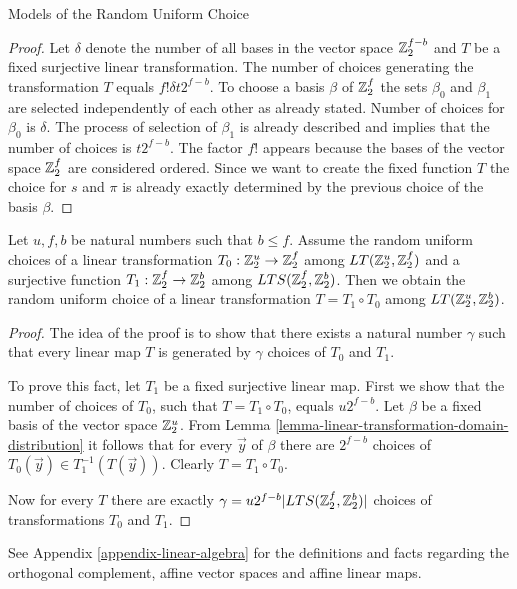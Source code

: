 \begin{section}{Models of the Random Uniform Choice}
\begin{proof}
Let $\delta$ denote the number of all bases in the vector space $\mathbb{Z}_{2}^{f - b}$ and $T$ be a fixed surjective linear transformation. The number of choices generating the transformation $T$ equals $f! \delta t 2 ^ {f - b}$. To choose a basis $\beta$ of $\mathbb{Z}_{2}^{f}$ the sets $\beta_0$ and $\beta_1$ are selected independently of each other as already stated. Number of choices for $\beta_0$ is $\delta$. The process of selection of $\beta_1$ is already described and implies that the number of choices is $t 2 ^ {f - b}$. The factor $f!$ appears because the bases of the vector space $\mathbb{Z}_{2}^{f}$ are considered ordered. Since we want to create the fixed function $T$ the choice for $s$ and $\pi$ is already exactly determined by the previous choice of the basis $\beta$. 
\end{proof}

\begin{remark}
\label{remark-model-uniform-linear-map-selection}
Let $u, f, b$ be natural numbers such that $b \leq f$. Assume the random uniform choices of a linear transformation $T_0: \mathbb{Z}_{2}^{u} \rightarrow \mathbb{Z}_{2}^{f}$ among $LT(\mathbb{Z}_{2}^{u}, \mathbb{Z}_{2}^{f})$ and a surjective function $T_1: \mathbb{Z}_{2}^{f} \rightarrow \mathbb{Z}_{2}^{b}$ among $LTS(\mathbb{Z}_{2}^{f}, \mathbb{Z}_{2}^{b})$. Then we obtain the random uniform choice of a linear transformation $T = T_1 \circ T_0$ among $LT(\mathbb{Z}_{2}^{u}, \mathbb{Z}_{2}^{b})$.
\end{remark}
\begin{proof}
The idea of the proof is to show that there exists a natural number $\gamma$ such that every linear map $T$ is generated by $\gamma$ choices of $T_0$ and $T_1$.

To prove this fact, let $T_1$ be a fixed surjective linear map. First we show that the number of choices of $T_0$, such that $T = T_1 \circ T_0$, equals $u 2 ^ {f - b}$. Let $\beta$ be a fixed basis of the vector space $\mathbb{Z}_{2}^{u}$. From Lemma \ref{lemma-linear-transformation-domain-distribution} it follows that for every $\vec{y}$ of $\beta$ there are $2 ^ {f - b}$ choices of $T_0(\vec{y}) \in T_1^{-1}(T(\vec{y}))$.  Clearly $T = T_1 \circ T_0$.

Now for every $T$ there are exactly $\gamma = u 2 ^ {f - b} |LTS(\mathbb{Z}_{2}^{f}, \mathbb{Z}_{2}^{b})|$ choices of transformations $T_0$ and $T_1$.
\end{proof}

See Appendix \ref{appendix-linear-algebra} for the definitions and facts regarding the orthogonal complement, affine vector spaces and affine linear maps. 


\end{section}
